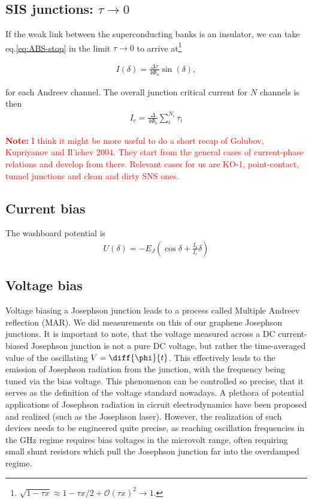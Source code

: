 \subsection{SIS junctions: $\tau \rightarrow 0$}
If the weak link between the superconducting banks is an insulator, we can take eq.\ref{eq:ABS-stop} in the limit $\tau \rightarrow 0$ to arrive at\footnote{$\sqrt{1-\tau x}\approx 1-\tau x/2+\mathcal{O}(\tau x)^2\rightarrow 1$.}

\begin{eqnarray}
I(\delta)=\frac{\Delta\tau}{4\Phi_0}\sin(\delta),
\end{eqnarray}

for each Andreev channel. The overall junction critical current for $N$ channels is then 
\begin{eqnarray}
	I_c=\frac{\Delta}{4\Phi_0}\sum_{i}^{N_i}\tau_i
\end{eqnarray}

\textcolor{red}{\textbf{Note:} I think it might be more useful to do a short recap of Golubov, Kupriyanov and Il'ichev 2004. 
They start from the general cases of current-phase relations and develop from there.
Relevant cases for us are KO-1, point-contact, tunnel junctions and clean and dirty SNS ones.}

\subsection{Current bias}

The washboard potential is 
%
\begin{align}
U(\delta) = -E_J \left( \cos\delta + \frac{I_b}{I_c}\delta \right)
\label{eq:washboard}
\end{align}

\subsection{Voltage bias}
Voltage biasing a Josephson junction leads to a process called Multiple Andreev reflection (MAR).
We did measurements on this of our graphene Josephson junctions.
It is important to note, that the voltage measured across a DC current-biased Josephson junction is not a pure DC voltage, but rather the time-averaged value of the oscillating $V=\diff{\phi}{t}$.
This effectively leads to the emission of Josephson radiation from the junction, with the frequency being tuned via the bias voltage.
This phenomenon can be controlled so precise, that it serves as the definition of the voltage standard nowadays.
A plethora of potential applications of Josephson radiation in cicruit electrodynamics have been proposed and realized (such as the Josephson laser).
However, the realization of such devices needs to be engineered quite precise, as reaching oscillation frequencies in the GHz regime requires bias voltages in the microvolt range, often requiring small shunt resistors which pull the Josephson junction far into the overdamped regime.